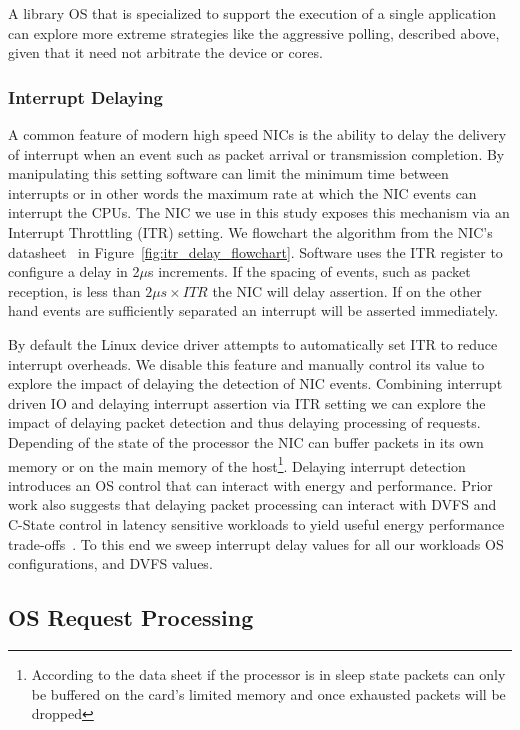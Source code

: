 A library OS that is specialized to support the execution of a single application can explore more extreme strategies like the aggressive polling, described above, given that it need not arbitrate the device or cores.

\subsubsection{Interrupt Delaying}
\label{sec:workflow:itrdelay}

A common feature of modern high speed NICs is the ability to delay the delivery of interrupt when an event such as packet arrival or transmission completion. By manipulating this setting software can limit the minimum time between interrupts or in other words the maximum rate at which the NIC events can interrupt the CPUs. The NIC we use in this study exposes this mechanism via an Interrupt Throttling (ITR) setting.  We flowchart the algorithm from the NIC's datasheet~\cite{82599} in  Figure~\ref{fig:itr_delay_flowchart}. Software uses the ITR register to configure a delay in 2$\mu$s increments.  If the spacing of events, such as packet reception, is less than  $2{\mu}s \times ITR$ the NIC will delay assertion.  If on the other hand events are sufficiently separated an interrupt will be asserted immediately.   

By default the Linux device driver attempts to automatically set ITR to reduce interrupt overheads.  We disable this feature and manually control its value to explore the impact of delaying the detection of NIC events.  Combining interrupt driven IO and delaying interrupt assertion via ITR setting we can explore the impact of delaying packet detection and thus delaying processing of requests.  Depending of the state of the processor the NIC can buffer packets in its own memory or on the main memory of the host\footnote{According to the data sheet if the processor is in sleep state packets can only be buffered on the card's limited memory and once exhausted packets will be dropped}.  Delaying interrupt detection introduces an OS control that can interact with energy and performance. Prior work also suggests that delaying packet processing can interact with DVFS and C-State control in latency sensitive workloads to yield useful energy performance trade-offs~\cite{mootaz, chou}. To this end we sweep interrupt delay values for all our workloads OS configurations, and DVFS values.

\subsection{OS Request Processing}
\label{sec:workflow:osreqproc}

